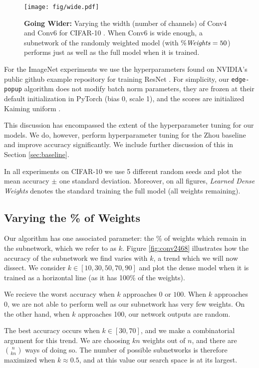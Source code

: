 \documentclass[10pt,twocolumn,letterpaper]{article}
\newcommand{\alg}{\texttt{edge-popup} }
\begin{document}
\begin{figure*}[t!]
    \centering
    \texttt{[image: fig/wide.pdf]}
    \caption{\textbf{Going Wider:} Varying the width (\ie number of channels) of Conv4 and Conv6 for CIFAR-10 \cite{cifar}. When Conv6 is wide enough, a subnetwork of the randomly weighted model (with $\% \textrm{\textit{Weights}} = 50$) performs just as well as the full model when it is trained.}
    \label{fig:wide}
\end{figure*}
For the ImageNet experiments we use the hyperparameters found on NVIDIA's public github example repository for training ResNet \cite{repo}. For simplicity, our \alg algorithm does not modify batch norm parameters, they are frozen at their default initialization in PyTorch (\ie bias 0, scale 1), and the scores are initialized Kaiming uniform \cite{kaiming-init}.

This discussion has encompassed the extent of the hyperparameter tuning for our models. We do, however, perform hyperparameter tuning for the Zhou \etal \cite{supermask} baseline and improve accuracy significantly. We include further discussion of this in Section \ref{sec:baseline}.

In all experiments on CIFAR-10 \cite{cifar} we use 5 different random seeds and plot the mean accuracy $\pm$ one standard deviation. Moreover, on all figures, \textit{Learned Dense Weights} denotes the standard training the full model (all weights remaining).

\subsection{Varying the \% of Weights}

Our algorithm has one associated parameter: the \% of weights which remain in the subnetwork, which we refer to as $k$. Figure \ref{fig:conv2468} illustrates how the accuracy of the subnetwork we find varies with $k$, a trend which we will now dissect. We consider $k \in [10, 30, 50, 70, 90]$ and plot the dense model when it is trained as a horizontal line (as it has 100\% of the weights). 

We recieve the worst accuracy when $k$ approaches $0$ or $100$. When $k$ approaches 0, we are not able to perform well as our subnetwork has very few weights. On the other hand, when $k$ approaches 100, our network outputs are random.

The best accuracy occurs when $k \in [30, 70]$, and we make a combinatorial argument for this trend. We are choosing $kn$ weights out of $n$, and there are $n \choose kn$ ways of doing so. The number of possible subnetworks is therefore maximized when $k \approx 0.5 $, and at this value our search space is at its largest.
\end{document}
